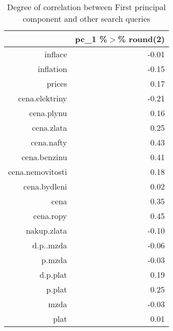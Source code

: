 \begin{table}[ht]
\centering
\begin{tabular}{rr}
  \hline
 & pc\_1 \%$>$\% round(2) \\ 
  \hline
inflace & -0.01 \\ 
  inflation & -0.15 \\ 
  prices & 0.17 \\ 
  cena.elektriny & -0.21 \\ 
  cena.plynu & 0.16 \\ 
  cena.zlata & 0.25 \\ 
  cena.nafty & 0.43 \\ 
  cena.benzinu & 0.41 \\ 
  cena.nemovitosti & 0.18 \\ 
  cena.bydleni & 0.02 \\ 
  cena & 0.35 \\ 
  cena.ropy & 0.45 \\ 
  nakup.zlata & -0.10 \\ 
  d.p..mzda & -0.06 \\ 
  p.mzda & -0.03 \\ 
  d.p.plat & 0.19 \\ 
  p.plat & 0.25 \\ 
  mzda & -0.03 \\ 
  plat & 0.01 \\ 
   \hline
\end{tabular}
\caption{Degree of correlation between First principal component and other search queries} 
\end{table}
